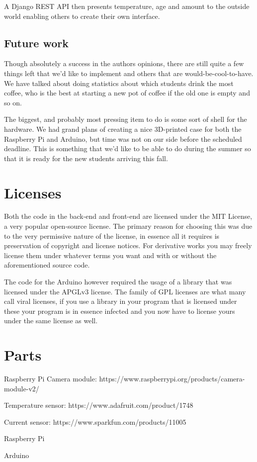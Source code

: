 \documentclass[12pt,a4paper,oneside,article]{memoir}
\numberwithin{equation}{chapter}
\begin{document}
A Django REST API then presents temperature, age and amount to the outside 
world enabling others to create their own interface. 

\section{Future work}\label{sec:future-work}
Though absolutely a success in the authors opinions, there are still quite a few
things left that we'd like to implement and others that are
would-be-cool-to-have. We have talked about doing statistics about which
students drink the most coffee, who is the best at starting a new pot of coffee
if the old one is empty and so on.

The biggest, and probably most pressing item to do is some sort of shell for the
hardware. We had grand plans of creating a nice 3D-printed case for both the
Raspberry Pi and Arduino, but time was not on our side before the scheduled
deadline. This is something that we'd like to be able to do during the summer so
that it is ready for the new students arriving this fall.

\clearpage
\appendix
\chapter{Licenses}\label{sec:licenses}
Both the code in the back-end and front-end are licensed under the MIT License,
a very popular open-source license. The primary reason for choosing this was due
to the very permissive nature of the license, in essence all it requires is
preservation of copyright and license notices. For derivative works you may
freely license them under whatever terms you want and with or without the
aforementioned source code.

The code for the Arduino however required the usage of a library that was
licensed under the APGLv3 license. The family of GPL licenses are what many call
viral licenses, if you use a library in your program that is licensed under
these your program is in essence infected and you now have to license yours
under the same license as well.

\chapter{Parts}\label{sec:parts}
Raspberry Pi Camera module: 
https://www.raspberrypi.org/products/camera-module-v2/

Temperature sensor: https://www.adafruit.com/product/1748

Current sensor: https://www.sparkfun.com/products/11005

Raspberry Pi

Arduino

\clearpage{}
\renewcommand*{\UrlFont}{\footnotesize\ttfamily}
\printbibliography{}
\end{document}
